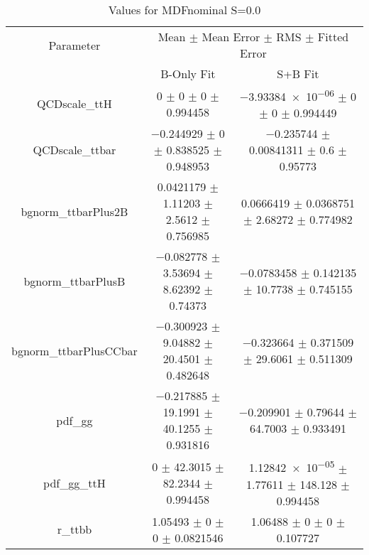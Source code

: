 \begin{table}
\centering
\caption{Values for MDFnominal S=0.0}
\begin{tabular}{ccc}
\toprule
Parameter & \multicolumn{2}{c}{Mean $\pm$ Mean Error $\pm$ RMS $\pm$ Fitted Error}\\
 & B-Only Fit & S+B Fit\\
\midrule
QCDscale\_ttH & \num{0} $\pm$ \num{0} $\pm$ \num{0} $\pm$ \num{0.994458} & \num{-3.93384e-06} $\pm$ \num{0} $\pm$ \num{0} $\pm$ \num{0.994449}\\
QCDscale\_ttbar & \num{-0.244929} $\pm$ \num{0} $\pm$ \num{0.838525} $\pm$ \num{0.948953} & \num{-0.235744} $\pm$ \num{0.00841311} $\pm$ \num{0.6} $\pm$ \num{0.95773}\\
bgnorm\_ttbarPlus2B & \num{0.0421179} $\pm$ \num{1.11203} $\pm$ \num{2.5612} $\pm$ \num{0.756985} & \num{0.0666419} $\pm$ \num{0.0368751} $\pm$ \num{2.68272} $\pm$ \num{0.774982}\\
bgnorm\_ttbarPlusB & \num{-0.082778} $\pm$ \num{3.53694} $\pm$ \num{8.62392} $\pm$ \num{0.74373} & \num{-0.0783458} $\pm$ \num{0.142135} $\pm$ \num{10.7738} $\pm$ \num{0.745155}\\
bgnorm\_ttbarPlusCCbar & \num{-0.300923} $\pm$ \num{9.04882} $\pm$ \num{20.4501} $\pm$ \num{0.482648} & \num{-0.323664} $\pm$ \num{0.371509} $\pm$ \num{29.6061} $\pm$ \num{0.511309}\\
pdf\_gg & \num{-0.217885} $\pm$ \num{19.1991} $\pm$ \num{40.1255} $\pm$ \num{0.931816} & \num{-0.209901} $\pm$ \num{0.79644} $\pm$ \num{64.7003} $\pm$ \num{0.933491}\\
pdf\_gg\_ttH & \num{0} $\pm$ \num{42.3015} $\pm$ \num{82.2344} $\pm$ \num{0.994458} & \num{1.12842e-05} $\pm$ \num{1.77611} $\pm$ \num{148.128} $\pm$ \num{0.994458}\\
r\_ttbb & \num{1.05493} $\pm$ \num{0} $\pm$ \num{0} $\pm$ \num{0.0821546} & \num{1.06488} $\pm$ \num{0} $\pm$ \num{0} $\pm$ \num{0.107727}\\
\bottomrule
\end{tabular}
\end{table}